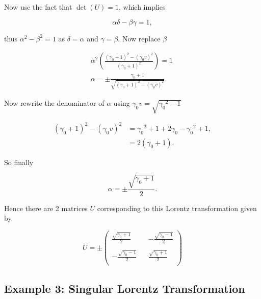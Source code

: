 \noindent  Now use the fact that $\det{(U)} = 1$, which implies

\begin{equation*}
\alpha \delta - \beta \gamma = 1,
\end{equation*}

\noindent thus $\alpha^2 - \beta^2 = 1$ as $\delta = \alpha$ and $\gamma = \beta$. Now replace $\beta$

\begin{gather*}
\alpha^2\left( \frac{(\gamma_0 + 1)^2 - (\gamma_0 v)^2}{(\gamma_0 + 1)^2}   \right) = 1\ \\
\alpha = \pm \frac{\gamma_0 + 1}{\sqrt{(\gamma_0 + 1)^2 - (\gamma_0 v)^2}}.
\end{gather*}

\noindent Now rewrite the denominator of $\alpha$ using $\gamma_0 v = \sqrt{{\gamma_0}^{2} - 1}$

\begin{align*}
(\gamma_0 + 1)^2 - (\gamma_0 v)^2 & = {\gamma_0}^{2} + 1 + 2\gamma_0 - {\gamma_0}^{2} + 1, \\
                                  & = 2(\gamma_0 + 1).
\end{align*}

\noindent So finally

\begin{equation*}
\alpha = \pm \frac{\sqrt{\gamma_0 + 1}}{2}.
\end{equation*}

\noindent Hence there are 2 matrices $U$ corresponding to this Lorentz transformation given by

\begin{equation*}
U = \pm
\left(
\begin{array}{ccc}
\frac{\sqrt{\gamma_0 + 1}}{2}   & & -\frac{\sqrt{\gamma_0 - 1}}{2} \\
 & & \\
- \frac{\sqrt{\gamma_0 - 1}}{2} & &  \frac{\sqrt{\gamma_0 + 1}}{2}  \\
\end{array}
\right)
\end{equation*}

\subsection{Example 3: Singular Lorentz Transformation}\label{Special_Linear_Matrices_Example_3}





